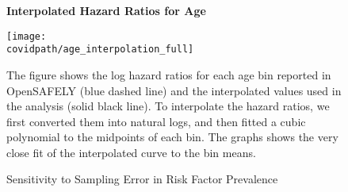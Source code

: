 \documentclass[12pt,letterpaper]{article}
\numberwithin{equation}{section}
\begin{document}
  \begin{figure}[H]
    \begin{center}
      \caption{Sensitivity to Sampling Error in Risk Factor Prevalence}
      
      \footnotesize{\textbf{Interpolated Hazard Ratios for Age}}
      
      \texttt{[image: \\covidpath/age\_interpolation\_full]}
    
    \end{center}
    
    \footnotesize{The figure shows the log hazard ratios for each age
      bin reported in OpenSAFELY (blue dashed line) and the
      interpolated values used in the analysis (solid black line). To
      interpolate the hazard ratios, we first converted them into
      natural logs, and then fitted a cubic polynomial to the
      midpoints of each bin. The graphs shows the very close fit of
      the interpolated curve to the bin means.}
  \end{figure}
  
\end{document}
